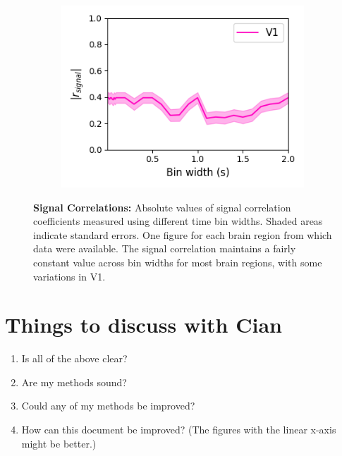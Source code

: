 \documentclass[a4paper,12pt]{article}
\theoremstyle{definition}
\begin{document}
\begin{figure}[p]
\begin{subfigure}{0.5\textwidth}
    \includegraphics[width=\textwidth]{figures/signal_linear_bin_width_correlations_v1_0.png}
  \end{subfigure}
  \caption{\textbf{Signal Correlations:} Absolute values of signal correlation coefficients measured using different time bin widths. Shaded areas indicate standard errors. One figure for each brain region from which data were available. The signal correlation maintains a fairly constant value across bin widths for most brain regions, with some variations in V1.}
  \label{fig:linear_bin_width_vs_signal_correlation_by_region}
\end{figure}

\section*{Things to discuss with Cian}
\begin{enumerate}
  \item Is all of the above clear?
  \item Are my methods sound?
  \item Could any of my methods be improved?
  \item How can this document be improved? (The figures with the linear x-axis might be better.)
\end{enumerate}


\newpage


\end{document}
